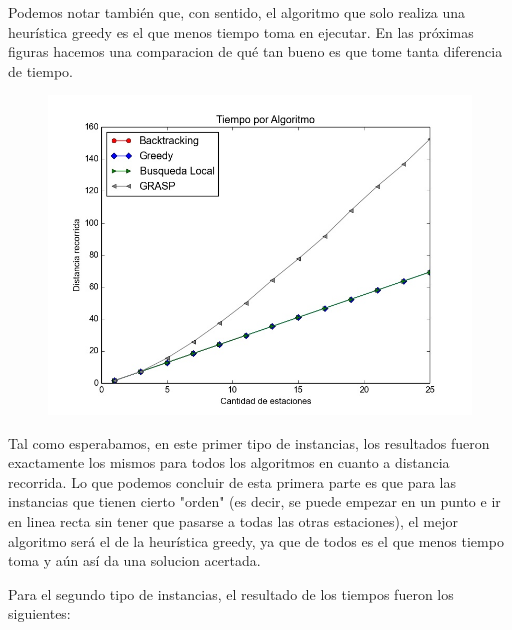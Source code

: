         Podemos notar también que, con sentido, el algoritmo que solo realiza una heurística greedy es el que menos tiempo toma en ejecutar. En las próximas figuras hacemos una comparacion de qué tan bueno es que tome tanta diferencia de tiempo.

        \begin{figure}[H]
            \begin{center}
              \includegraphics[width=0.7\columnwidth]{imagenes/exp1a_ej5_correctitud_solucion.jpeg}
              \caption{}
            \end{center}
        \end{figure}

        Tal como esperabamos, en este primer tipo de instancias, los resultados fueron exactamente los mismos para todos los algoritmos en cuanto a distancia recorrida. Lo que podemos concluir de esta primera parte es que para las instancias que tienen cierto "orden" (es decir, se puede empezar en un punto e ir en linea recta sin tener que pasarse a todas las otras estaciones), el mejor algoritmo será el de la heurística greedy, ya que de todos es el que menos tiempo toma y aún así da una solucion acertada.

        Para el segundo tipo de instancias, el resultado de los tiempos fueron los siguientes:


